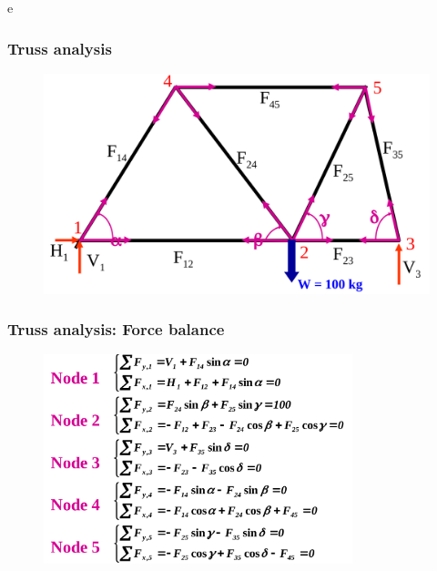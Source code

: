 \documentclass[notes]{beamer}
\begin{document}
e
\begin{frame}
	\frametitle{Truss analysis}
	\begin{figure}[ht]
		\centering
		\includegraphics[width=\textwidth]{figs/truss.png}
	\end{figure}
\end{frame}

\begin{frame}
	\frametitle{Truss analysis: Force balance}
	\begin{figure}[ht]
		\centering
		\includegraphics[width=0.8\textwidth]{figs/force-balance.png}
	\end{figure}
\end{frame}
\end{document}
